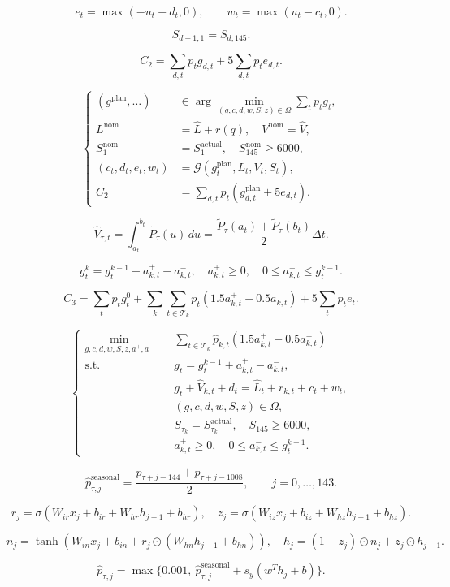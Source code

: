 \[
e_t=\max(-u_t-d_t,0),\qquad w_t=\max(u_t-c_t,0).
\]

\[
S_{d+1,1}=S_{d,145}.
\]

\[
C_2=\sum_{d,t}p_tg_{d,t}+5\sum_{d,t}p_te_{d,t}.
\]

\[
\boxed{\left\{\begin{aligned}(g^{\mathrm{plan}},\ldots)&\in\arg\min_{(g,c,d,w,S,z)\in\Omega}\sum_t p_tg_t,\\L^{\mathrm{nom}}&=\hat L+r(q),\quad V^{\mathrm{nom}}=\hat V,\\S_1^{\mathrm{nom}}&=S_1^{\mathrm{actual}},\quad S_{145}^{\mathrm{nom}}\geq6000,\\(c_t,d_t,e_t,w_t)&=\mathcal G(g_t^{\mathrm{plan}},L_t,V_t,S_t),\\C_2&=\sum_{d,t}p_t(g_{d,t}^{\mathrm{plan}}+5e_{d,t}).\end{aligned}\right.}
\]

\[
\hat V_{\tau,t}=\int_{a_t}^{b_t}\tilde P_\tau(u)\,du=\frac{\tilde P_\tau(a_t)+\tilde P_\tau(b_t)}{2}\Delta t.
\]

\[
g_t^{k}=g_t^{k-1}+a_{k,t}^{+}-a_{k,t}^{-},\quad a_{k,t}^{\pm}\ge0,\quad 0\le a_{k,t}^{-}\le g_t^{k-1}.
\]

\[
C_3=\sum_t p_tg_t^0+\sum_k\sum_{t\in\mathcal T_k}p_t(1.5a_{k,t}^{+}-0.5a_{k,t}^{-})+5\sum_t p_te_t.
\]

\[
\boxed{\left\{\begin{aligned}\min_{g,c,d,w,S,z,a^+,a^-}\quad&\sum_{t\in\mathcal T_k}\hat p_{k,t}(1.5a_{k,t}^{+}-0.5a_{k,t}^{-})\\\mathrm{s.t.}\quad&g_t=g_t^{k-1}+a_{k,t}^{+}-a_{k,t}^{-},\\&g_t+\hat V_{k,t}+d_t=\hat L_t+r_{k,t}+c_t+w_t,\\&(g,c,d,w,S,z)\in\Omega,\\&S_{\tau_k}=S_{\tau_k}^{\mathrm{actual}},\quad S_{145}\ge6000,\\&a_{k,t}^{+}\ge0,\quad0\le a_{k,t}^{-}\le g_t^{k-1}.\end{aligned}\right.}
\]

\[
\hat p_{\tau,j}^{\mathrm{seasonal}}=\frac{p_{\tau+j-144}+p_{\tau+j-1008}}{2},\qquad j=0,\ldots,143.
\]

\[
r_j=\sigma(W_{ir}x_j+b_{ir}+W_{hr}h_{j-1}+b_{hr}),\quad z_j=\sigma(W_{iz}x_j+b_{iz}+W_{hz}h_{j-1}+b_{hz}).
\]

\[
n_j=\tanh(W_{in}x_j+b_{in}+r_j\odot(W_{hn}h_{j-1}+b_{hn})),\quad h_j=(1-z_j)\odot n_j+z_j\odot h_{j-1}.
\]

\[
\hat p_{\tau,j}=\max\{0.001,\ \hat p_{\tau,j}^{\mathrm{seasonal}}+s_y(w^Th_j+b)\}.
\]
